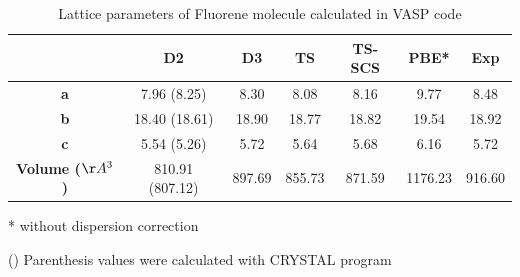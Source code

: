  				\begin{table}[H]
 					\caption{Lattice parameters of Fluorene molecule calculated in VASP code}  \label{table-fluorenesol}
 					\begin{center}
 						\begin{threeparttable}
 						\begin{tabular}{c c c c c c c}
 							\toprule
 							& \textbf{D2} & \textbf{D3} & \textbf{TS} & \textbf{TS-SCS} & \textbf{PBE*} & \textbf{Exp} \\
 							\midrule
 							\textbf{a} & 7.96 (8.25) & 8.30 & 8.08 & 8.16 & 9.77 & 8.48 \\
 							\textbf{b}& 18.40 (18.61) & 18.90 & 18.77 & 18.82 & 19.54 & 18.92\\
 							\textbf{c}& 5.54 (5.26) & 5.72 & 5.64 & 5.68 & 6.16 & 5.72\\
 							\textbf{Volume ($\AA^{3}$)}& 810.91 (807.12) & 897.69 & 855.73 & 871.59 & 1176.23 & 916.60\\
 							\bottomrule
 						\end{tabular}
 						
 						\begin{tablenotes}
 							\item[*] without dispersion correction
 							\item[()] Parenthesis values were calculated with CRYSTAL program
 						\end{tablenotes}
 					\end{threeparttable}
 					\end{center}
 				\end{table}
 				

